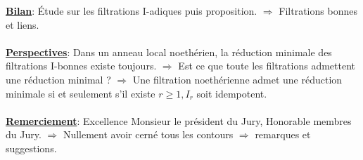 \documentclass[12pt, a4paper, oneside]{article}
\begin{document}
	\underline{\textbf{Bilan}}: Étude sur les filtrations I-adiques puis proposition.   $\Longrightarrow $ Filtrations bonnes et liens.\\\\
	\underline{\textbf{Perspectives}}: Dans un anneau local noethérien, la réduction minimale des filtrations I-bonnes existe toujours. $\Longrightarrow $ Est ce que toute les filtrations admettent une réduction minimal ? $\Longrightarrow $ Une filtration noethérienne admet une réduction minimale si et seulement s'il existe $r \geqslant 1 , I_r$ soit idempotent. \\\\
	\underline{\textbf{Remerciement}}: Excellence Monsieur le président du Jury, Honorable membres du Jury. $\Longrightarrow $  Nullement avoir cerné tous les contours $\Longrightarrow $  remarques et suggestions.\\\\
	
\end{document}
